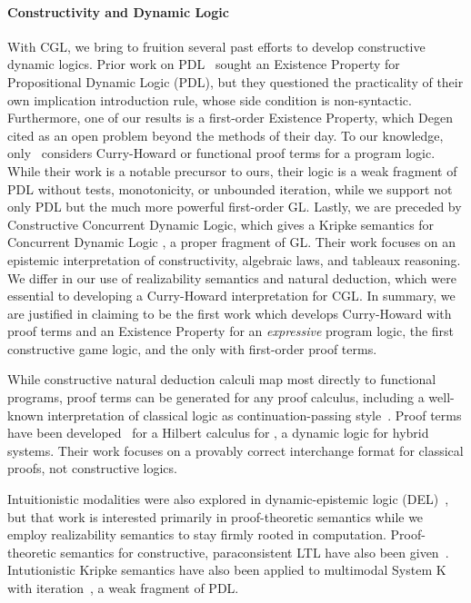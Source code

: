 \documentclass[12pt]{cmuthesis}
\theoremstyle{definition}
\theoremstyle{remark}
\newcommand{\CGL}{\textsf{CGL}\xspace}
\newcommand{\GL}{GL\xspace}
\begin{document}
\paragraph{Constructivity and Dynamic Logic}
With \CGL, we bring to fruition several past efforts to develop constructive dynamic logics.
Prior work on PDL~\cite{degen2006towards} sought an Existence Property for Propositional Dynamic Logic (PDL), but they questioned the practicality of their own implication introduction rule, whose side condition is non-syntactic.
Furthermore, one of our results is a first-order Existence Property, which Degen cited as an open problem beyond the methods of their day.
To our knowledge, only~\cite{kamide2010strong} considers Curry-Howard or functional proof terms for a program logic.
While their work is a notable precursor to ours, their logic is a weak fragment of PDL without tests, monotonicity, or unbounded iteration, while we support not only PDL but the much more powerful first-order \GL.
Lastly, we are preceded by Constructive Concurrent Dynamic Logic, \cite{DBLP:journals/apal/WijesekeraN05} which gives a Kripke semantics for Concurrent Dynamic Logic \cite{DBLP:journals/jacm/Peleg87}, a proper fragment of \GL.
Their work focuses on an epistemic interpretation of constructivity, algebraic laws, and tableaux reasoning.
We differ in our use of realizability semantics and natural deduction, which were essential to developing a Curry-Howard interpretation for \CGL.
In summary, we are justified in claiming to be the first work which develops Curry-Howard with proof terms and an Existence Property for an \emph{expressive} program logic, the first constructive game logic, and the only with first-order proof terms.

While constructive natural deduction calculi map most directly to functional programs, proof terms can be generated for any proof calculus, including a well-known interpretation of classical logic as continuation-passing style~\cite{DBLP:conf/popl/Griffin90}.
Proof terms have been developed~\cite{DBLP:conf/cpp/FultonP16} for a Hilbert calculus for \dL, a dynamic logic for hybrid systems.
Their work focuses on a provably correct interchange format for classical \dL proofs, not constructive logics.

Intuitionistic modalities were also explored in dynamic-epistemic logic (DEL)~\cite{DBLP:journals/logcom/FrittellaGKPS16}, but that work is interested primarily in proof-theoretic semantics while we employ realizability semantics to stay firmly rooted in computation.
Proof-theoretic semantics for constructive, paraconsistent LTL have also been given~\cite{DBLP:journals/japll/KamideW10}.
Intutionistic Kripke semantics have also been applied to multimodal System K with iteration~\cite{DBLP:journals/fuin/Celani01}, a weak fragment of PDL.
\end{document}
